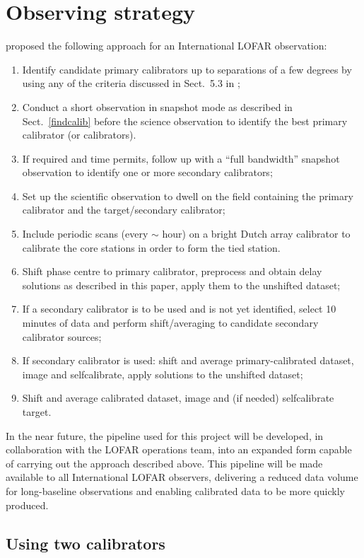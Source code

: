 \documentclass[graybox]{svmult}
\begin{document}
\section{Observing strategy}
\cite{moldon15} proposed the following approach for an International LOFAR observation: 
\begin{enumerate}
\item Identify candidate primary calibrators up to separations of a few degrees 
    by using any of the criteria discussed in Sect.~5.3 in
    \cite{moldon15};
\item Conduct a short observation in snapshot mode as described
in Sect.~\ref{findcalib} before the science observation to identify
the best primary calibrator (or calibrators).
\item If required and time permits, follow up with a ``full bandwidth'' snapshot observation to 
identify one or more secondary calibrators;
\item Set up the scientific observation to dwell on the field 
containing the primary calibrator and the target/secondary calibrator;
\item Include periodic scans (every $\sim$ hour) on a bright Dutch array 
calibrator to calibrate the core stations in order to form the tied station.
\item Shift phase centre to primary calibrator, preprocess and obtain delay solutions 
as described in this paper, apply them to the unshifted dataset;
\item If a secondary calibrator is to be used and is not yet identified, select 10 minutes
of data and perform shift/averaging to candidate secondary calibrator sources;
\item If secondary calibrator is used: shift and average primary-calibrated dataset, 
image and selfcalibrate, apply solutions to the unshifted dataset;
\item Shift and average calibrated dataset, image and (if needed) selfcalibrate target.
\end{enumerate}

In the near future, the pipeline used for this project will be developed, in
collaboration with the LOFAR operations team, into an expanded form capable of
carrying out the approach described above.  This pipeline will be made available
to all International LOFAR observers, delivering a reduced data volume for
long-baseline observations and enabling calibrated data to be more quickly
produced.

\subsection{Using two calibrators}
\end{document}
